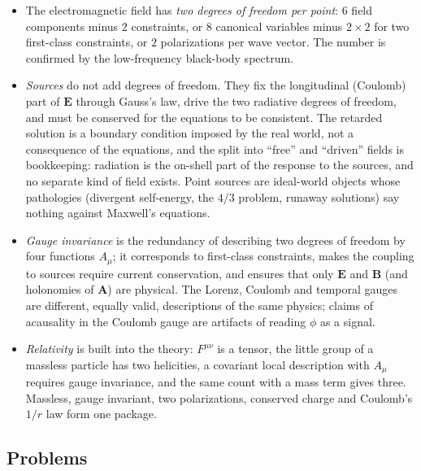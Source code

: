 \documentclass[11pt,a4paper]{book}
\begin{document}
\begin{itemize}
\item The electromagnetic field has \emph{two degrees of freedom per point}: $6$ field components minus
$2$ constraints, or $8$ canonical variables minus $2\times2$ for two first-class constraints, or
$2$ polarizations per wave vector. The number is confirmed by the low-frequency black-body spectrum.
\item \emph{Sources} do not add degrees of freedom. They fix the longitudinal (Coulomb) part of
$\mathbf E$ through Gauss's law, drive the two radiative degrees of freedom, and must be conserved for
the equations to be consistent. The retarded solution is a boundary condition imposed by the real world,
not a consequence of the equations, and the split into ``free'' and ``driven'' fields is bookkeeping:
radiation is the on-shell part of the response to the sources, and no separate kind of field exists. Point sources are ideal-world objects whose pathologies
(divergent self-energy, the $4/3$ problem, runaway solutions) say nothing against Maxwell's equations.
\item \emph{Gauge invariance} is the redundancy of describing two degrees of freedom by four functions
$A_\mu$; it corresponds to first-class constraints, makes the coupling to sources require current
conservation, and ensures that only $\mathbf E$ and $\mathbf B$ (and holonomies of $\mathbf A$) are
physical. The Lorenz, Coulomb and temporal gauges are different, equally valid, descriptions of the same
physics; claims of acausality in the Coulomb gauge are artifacts of reading $\phi$ as a signal.
\item \emph{Relativity} is built into the theory: $F^{\mu\nu}$ is a tensor, the little group of a massless
particle has two helicities, a covariant local description with $A_\mu$ requires gauge invariance, and
the same count with a mass term gives three. Massless, gauge invariant, two polarizations, conserved
charge and Coulomb's $1/r$ law form one package.
\end{itemize}

\subsection*{Problems}
\end{document}
